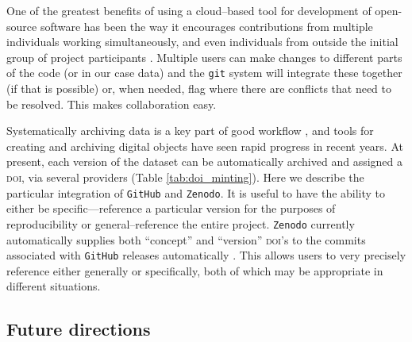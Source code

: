 \documentclass[a4paper,11pt]{article}
\begin{document}
One of the greatest benefits of using a cloud--based tool for development of open-source software has been the way it encourages contributions from multiple individuals working simultaneously, and even individuals from outside the initial group of project participants \citep{Rogers-2013}. Multiple users can make changes to different parts of the code (or in our case data) and the \texttt{git} system will integrate these together (if that is possible) or, when needed, flag where there are conflicts that need to be resolved. This makes collaboration easy.

Systematically archiving data is a key part of good workflow \citep{Wilkinson-2016, Piwowar-2011, Whitlock-2011}, and tools for creating and archiving digital objects have seen rapid progress in recent years.  At present, each version of the dataset can be automatically archived and assigned a \textsc{doi}, via several providers (Table \ref{tab:doi_minting}).  Here we describe the particular integration of \texttt{GitHub} and \texttt{Zenodo}.  It is useful to have the ability to either be specific---reference a particular version for the purposes of reproducibility or general--reference the entire project.  \texttt{Zenodo} currently automatically supplies both ``concept'' and ``version'' \textsc{doi}'s to the commits associated with \texttt{GitHub} releases automatically \citep[Figure \ref{fig:semantic} and ][]{Nielsen-2017}.  This allows users to very precisely reference either generally or specifically, both of which may be appropriate in different situations.  



\subsection{Future directions}
\end{document}
